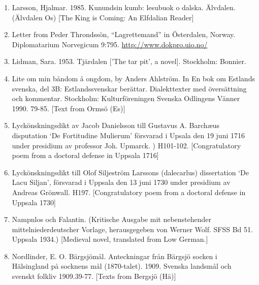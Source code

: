 \begin{enumerate}
\item 
\label{bkm:Ref173049435}Larsson, Hjalmar. 1985. Kunundsin kumb: lesubuok o dalska. Älvdalen. (Älvdalen Os) [The King is Coming: An Elfdalian Reader]
\item 
Letter from Peder Throndssön, “Lagrettemand” in Österdalen, Norway. Diplomatarium Norvegicum 9:795.\newline
\url{http://www.dokpro.uio.no/}
\item 
\label{bkm:Ref150578023}Lidman, Sara. 1953. Tjärdalen [’The tar pit’, a novel]. Stockholm: Bonnier.

\item 
\label{bkm:Ref169951680}Lite om min båndom å ongdom, by Anders Ahlström. In En bok om Estlands svenska, del 3B: Estlandssvenskar berättar. Dialekttexter med översättning och kommentar. Stockholm: Kulturföreningen Svenska Odlingens Vänner 1990. 79-85. [Text from Ormsö (Es)]

\item 
\label{bkm:Ref154213694}Lyckönskningsdikt av Jacob Danielsson till Gustavus A. Barchæus disputation ‘De Fortitudine Mulierum’ försvarad i Upsala den 19 juni 1716 under presidium av professor Joh. Upmarck. ) H101-102. [Congratulatory poem from a doctoral defense in Uppsala 1716]
\item 
\label{bkm:Ref160604331}Lyckönskningsdikt till Olof Siljeström Larssons (dalecarlus) dissertation ‘De Lacu Siljan’, försvarad i Uppsala den 13 juni 1730 under presidium av Andreas Grönwall. H197. [Congratulatory poem from a doctoral defense in Uppsala 1730]

\item 
\label{bkm:Ref155341402}Nampnlos och Falantin. (Kritische Ausgabe mit nebenstehender mittelniederdeutscher Vorlage, herausgegeben von Werner Wolf. SFSS Bd 51. Uppsala 1934.) [Medieval novel, translated from Low German.]
\item 
\label{bkm:Ref154203595}Nordlinder, E. O. Bärgsjömål. Anteckningar från Bärgsjö socken i Hälsingland på socknens mål (1870-talet). 1909. Svenska landsmål och svenskt folkliv 1909.39-77. [Texts from Bergsjö (Hä)]


\end{enumerate}
